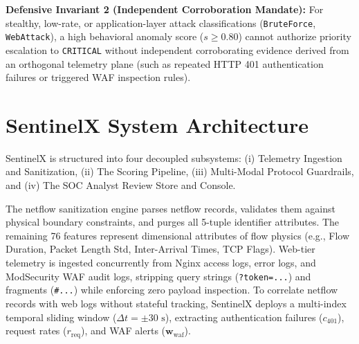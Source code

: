 \documentclass[conference]{IEEEtran}
\begin{document}
\textbf{Defensive Invariant 2 (Independent Corroboration Mandate):} For stealthy, low-rate, or application-layer attack classifications (\texttt{BruteForce}, \texttt{WebAttack}), a high behavioral anomaly score ($s \ge 0.80$) cannot authorize priority escalation to \texttt{CRITICAL} without independent corroborating evidence derived from an orthogonal telemetry plane (such as repeated HTTP 401 authentication failures or triggered WAF inspection rules).

\section{SentinelX System Architecture}
SentinelX is structured into four decoupled subsystems: (i) Telemetry Ingestion and Sanitization, (ii) The Scoring Pipeline, (iii) Multi-Modal Protocol Guardrails, and (iv) The SOC Analyst Review Store and Console.

The netflow sanitization engine parses netflow records, validates them against physical boundary constraints, and purges all 5-tuple identifier attributes. The remaining 76 features represent dimensional attributes of flow physics (e.g., Flow Duration, Packet Length Std, Inter-Arrival Times, TCP Flags). Web-tier telemetry is ingested concurrently from Nginx access logs, error logs, and ModSecurity WAF audit logs, stripping query strings (\texttt{?token=...}) and fragments (\texttt{\#...}) while enforcing zero payload inspection. To correlate netflow records with web logs without stateful tracking, SentinelX deploys a multi-index temporal sliding window ($\Delta t = \pm 30\text{ s}$), extracting authentication failures ($c_{401}$), request rates ($r_{\text{req}}$), and WAF alerts ($\mathbf{w}_{\text{waf}}$).
\end{document}
